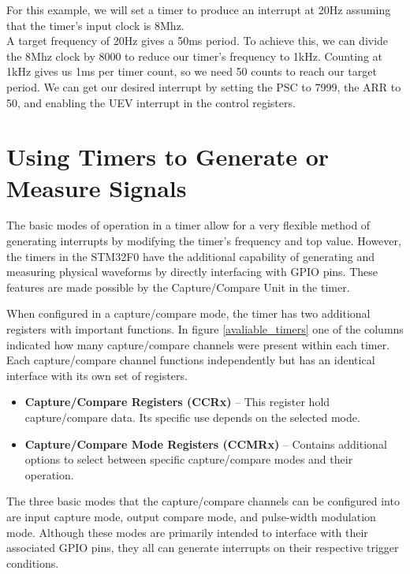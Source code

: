\documentclass[11pt,fleqn]{book} %
\begin{document}
            
        \begin{center}
            \begin{example} 
            For this example, we will set a timer to produce an interrupt at 20Hz assuming that the timer's input clock is 8Mhz. \\
            
            A target frequency of 20Hz gives a 50ms period. To achieve this, we can divide the 8Mhz clock by 8000 to reduce our timer's frequency to 1kHz. Counting at 1kHz gives us 1ms per timer count, so we need 50 counts to reach our target period. We can get our desired interrupt by setting the PSC to 7999, the ARR to 50, and enabling the UEV interrupt in the control registers.  
            \end{example}
        \end{center}
        
    

\section{Using Timers to Generate or Measure Signals}
The basic modes of operation in a timer allow for a very flexible method of generating interrupts by modifying the timer's frequency and top value. However, the timers in the STM32F0 have the additional capability of generating and measuring physical waveforms by directly interfacing with GPIO pins. These features are made possible by the Capture/Compare Unit in the timer. 

When configured in a capture/compare mode, the timer has two additional registers with important functions.  In figure \ref{avaliable_timers} one of the columns indicated how many capture/compare channels were present within each timer. Each capture/compare channel functions independently but has an identical interface with its own set of registers.  
\begin{itemize}
    \item \textbf{Capture/Compare Registers (CCRx)} -- This register hold capture/compare data. Its specific use depends on the selected mode.
    \item \textbf{Capture/Compare Mode Registers (CCMRx)} -- Contains additional options to select between specific capture/compare modes and their operation.
\end{itemize}

The three basic modes that the capture/compare channels can be configured into are input capture mode, output compare mode, and pulse-width modulation mode. Although these modes are primarily intended to interface with their associated GPIO pins, they all can generate interrupts on their respective trigger conditions. 
\end{document}
